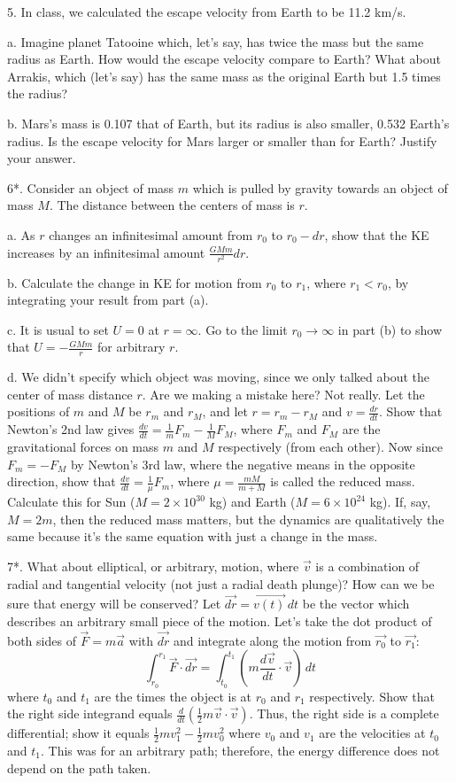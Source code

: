 \documentclass[12pt]{article}
\begin{document}
5. In class, we calculated the escape velocity from Earth to be 11.2 km/s. 

a. Imagine planet Tatooine which, let's say, has twice the mass but the same radius as Earth. How would the escape velocity compare to Earth? What about Arrakis, which (let's say) has the same mass as the original Earth but 1.5 times the radius?

b. Mars's mass is 0.107 that of Earth, but its radius is also smaller, 0.532 Earth's radius. Is the escape velocity for Mars larger or smaller than for Earth? Justify your answer. 


6*. Consider an object of mass $m$ which is pulled by gravity towards an object of mass $M$. The distance between the centers of mass is $r$.

a. As $r$ changes an infinitesimal amount from $r_0$ to $r_0-dr$, show that the KE increases by an infinitesimal amount $\frac{GMm}{r^2}dr$.

b. Calculate the change in KE for motion from $r_0$ to $r_1$, where $r_1<r_0$, by integrating your result from part (a). 

c. It is usual to set $U=0$ at $r=\infty$. Go to the limit $r_0\rightarrow \infty$ in part (b) to show that $U=-\frac{GMm}{r}$ for arbitrary $r$.

d. We didn't specify which object was moving, since we only talked about the center of mass distance $r$. Are we making a mistake here? Not really. Let the positions of $m$ and $M$ be $r_m$ and $r_M$, and let $r=r_m-r_M$ and $v=\frac{dr}{dt}$. Show that Newton's 2nd law gives $\frac{dv}{dt}=\frac{1}{m}F_m-\frac{1}{M}F_M$, where $F_m$ and $F_M$ are the gravitational forces on mass $m$ and $M$ respectively (from each other). Now since $F_m=-F_M$ by Newton's 3rd law, where the negative means in the opposite direction, show that $\frac{dv}{dt}=\frac{1}{\mu}F_m$, where $\mu=\frac{mM}{m+M}$ is called the reduced mass. Calculate this for Sun ($M=2\times 10^{30}$ kg) and Earth ($M=6 \times 10^{24}$ kg). If, say, $M=2m$, then the reduced mass matters, but the dynamics are qualitatively the same because it's the same equation with just a change in the mass. 

7*. What about elliptical, or arbitrary, motion, where $\vec{v}$ is a combination of radial and tangential velocity (not just a radial death plunge)? How can we be sure that energy will be conserved? Let $\vec{dr} = \vec{v(t)}\,dt$ be the vector which describes an arbitrary small piece of the motion. Let's take the dot product of both sides of $\vec{F}=m\vec{a}$ with $\vec{dr}$ and integrate along the motion from $\vec{r_0}$ to $\vec{r_1}$:
\begin{equation}
\int_{r_0}^{r_1} \vec{F}\cdot\vec{dr} = \int_{t_0}^{t_1} (m \frac{d\vec{v}}{dt}\cdot \vec{v}) \, dt
\end{equation}
where $t_0$ and $t_1$ are the times the object is at $r_0$ and $r_1$ respectively. Show that the right side integrand equals $\frac{d}{dt} (\frac{1}{2}m\vec{v}\cdot\vec{v})$. Thus, the right side is a complete differential; show it equals $\frac{1}{2}mv_1^2-\frac{1}{2}mv_0^2$ where $v_0$ and $v_1$ are the velocities at $t_0$ and $t_1$. This was for an arbitrary path; therefore, the energy difference does not depend on the path taken. 
\end{document}
